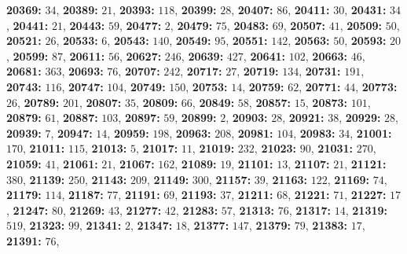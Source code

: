 \textsf{\bfseries 20369:} $34$, \textsf{\bfseries 20389:} $21$, \textsf{\bfseries 20393:} $118$, \textsf{\bfseries 20399:} $28$, \textsf{\bfseries 20407:} $86$, \textsf{\bfseries 20411:} $30$, \textsf{\bfseries 20431:} $34$, \textsf{\bfseries 20441:} $21$, \textsf{\bfseries 20443:} $59$, \textsf{\bfseries 20477:} $2$, \textsf{\bfseries 20479:} $75$, \textsf{\bfseries 20483:} $69$, \textsf{\bfseries 20507:} $41$, \textsf{\bfseries 20509:} $50$, \textsf{\bfseries 20521:} $26$, \textsf{\bfseries 20533:} $6$, \textsf{\bfseries 20543:} $140$, \textsf{\bfseries 20549:} $95$, \textsf{\bfseries 20551:} $142$, \textsf{\bfseries 20563:} $50$, \textsf{\bfseries 20593:} $20$, \textsf{\bfseries 20599:} $87$, \textsf{\bfseries 20611:} $56$, \textsf{\bfseries 20627:} $246$, \textsf{\bfseries 20639:} $427$, \textsf{\bfseries 20641:} $102$, \textsf{\bfseries 20663:} $46$, \textsf{\bfseries 20681:} $363$, \textsf{\bfseries 20693:} $76$, \textsf{\bfseries 20707:} $242$, \textsf{\bfseries 20717:} $27$, \textsf{\bfseries 20719:} $134$, \textsf{\bfseries 20731:} $191$, \textsf{\bfseries 20743:} $116$, \textsf{\bfseries 20747:} $104$, \textsf{\bfseries 20749:} $150$, \textsf{\bfseries 20753:} $14$, \textsf{\bfseries 20759:} $62$, \textsf{\bfseries 20771:} $44$, \textsf{\bfseries 20773:} $26$, \textsf{\bfseries 20789:} $201$, \textsf{\bfseries 20807:} $35$, \textsf{\bfseries 20809:} $66$, \textsf{\bfseries 20849:} $58$, \textsf{\bfseries 20857:} $15$, \textsf{\bfseries 20873:} $101$, \textsf{\bfseries 20879:} $61$, \textsf{\bfseries 20887:} $103$, \textsf{\bfseries 20897:} $59$, \textsf{\bfseries 20899:} $2$, \textsf{\bfseries 20903:} $28$, \textsf{\bfseries 20921:} $38$, \textsf{\bfseries 20929:} $28$, \textsf{\bfseries 20939:} $7$, \textsf{\bfseries 20947:} $14$, \textsf{\bfseries 20959:} $198$, \textsf{\bfseries 20963:} $208$, \textsf{\bfseries 20981:} $104$, \textsf{\bfseries 20983:} $34$, \textsf{\bfseries 21001:} $170$, \textsf{\bfseries 21011:} $115$, \textsf{\bfseries 21013:} $5$, \textsf{\bfseries 21017:} $11$, \textsf{\bfseries 21019:} $232$, \textsf{\bfseries 21023:} $90$, \textsf{\bfseries 21031:} $270$, \textsf{\bfseries 21059:} $41$, \textsf{\bfseries 21061:} $21$, \textsf{\bfseries 21067:} $162$, \textsf{\bfseries 21089:} $19$, \textsf{\bfseries 21101:} $13$, \textsf{\bfseries 21107:} $21$, \textsf{\bfseries 21121:} $380$, \textsf{\bfseries 21139:} $250$, \textsf{\bfseries 21143:} $209$, \textsf{\bfseries 21149:} $300$, \textsf{\bfseries 21157:} $39$, \textsf{\bfseries 21163:} $122$, \textsf{\bfseries 21169:} $74$, \textsf{\bfseries 21179:} $114$, \textsf{\bfseries 21187:} $77$, \textsf{\bfseries 21191:} $69$, \textsf{\bfseries 21193:} $37$, \textsf{\bfseries 21211:} $68$, \textsf{\bfseries 21221:} $71$, \textsf{\bfseries 21227:} $17$, \textsf{\bfseries 21247:} $80$, \textsf{\bfseries 21269:} $43$, \textsf{\bfseries 21277:} $42$, \textsf{\bfseries 21283:} $57$, \textsf{\bfseries 21313:} $76$, \textsf{\bfseries 21317:} $14$, \textsf{\bfseries 21319:} $519$, \textsf{\bfseries 21323:} $99$, \textsf{\bfseries 21341:} $2$, \textsf{\bfseries 21347:} $18$, \textsf{\bfseries 21377:} $147$, \textsf{\bfseries 21379:} $79$, \textsf{\bfseries 21383:} $17$, \textsf{\bfseries 21391:} $76$, 
